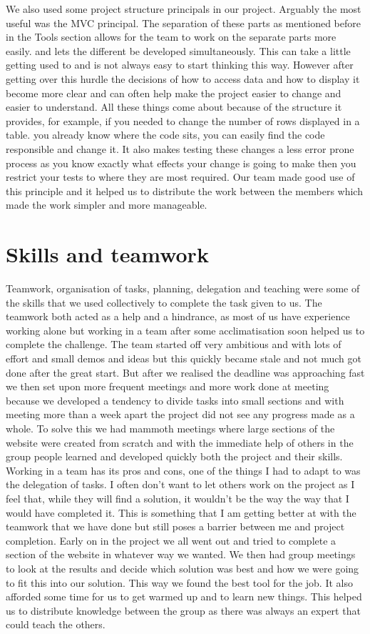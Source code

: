 \documentclass[11pt]{article}
\begin{document}
We also used some project structure principals in our project. Arguably the most useful was the MVC principal. The separation of these parts as mentioned before in the Tools section allows for the team to work on the separate parts more easily. and lets the different be developed simultaneously.
This can take a little getting used to and is not always easy to start thinking this way. However after getting over this hurdle the decisions of how to access data and how to display it become more clear and can often help make the project easier to change and easier to understand. All these things come about because of the structure it provides, for example, if you needed to change the number of rows displayed in a table. you already know where the code sits, you can easily find the code responsible and change it. It also makes testing these changes a less error prone process as you know exactly what effects your change is going to make then you restrict your tests to where they are most required. 
Our team made good use of this principle and it helped us to distribute the work between the members which made the work simpler and more manageable.

\section{Skills and teamwork}

Teamwork, organisation of tasks, planning, delegation and teaching were some of the skills that we used collectively to complete the task given to us. The teamwork both acted as a help and a hindrance, as most of us have experience working alone but working in a team after some acclimatisation soon helped us to complete the challenge.
The team started off very ambitious and with lots of effort and small demos and ideas but this quickly became stale and not much got done after the great start. But after we realised the deadline was approaching fast we then set upon more frequent meetings and more work done at meeting because we developed a tendency to divide tasks into small sections and with meeting more than a week apart the project did not see any progress made as a whole. To solve this we had mammoth meetings where large sections of the website were created from scratch and with the immediate help of others in the group people learned and developed quickly both the project and their skills. 
Working in a team has its pros and cons, one of the things I had to adapt to was the delegation of tasks. I often don't want to let others work on the project as I feel that, while they will find a solution, it wouldn't be the way the way that I would have completed it. This is something that I am getting better at with the teamwork that we have done but still poses a barrier between me and project completion.
Early on in the project we all went out and tried to complete a section of the website in whatever way we wanted. We then had group meetings to look at the results and decide which solution was best and how  we were going to fit this into our solution. This way we found the best tool for the job. It also afforded some time for us to get warmed up and to learn new things. This helped us to distribute knowledge between the group as there was always an expert that could teach the others.
\end{document}
